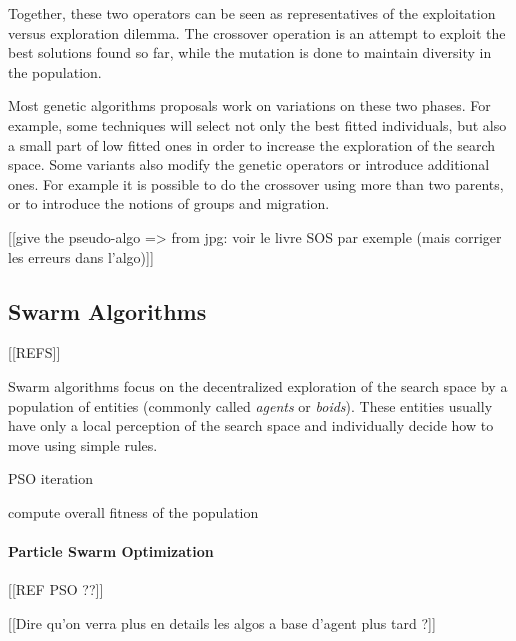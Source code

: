 Together, these two operators can be seen as representatives of the exploitation versus exploration dilemma. The crossover operation is an attempt to exploit the best solutions found so far, while the mutation is done to maintain diversity in the population. 

Most genetic algorithms proposals work on variations on these two phases. For example, some techniques will select not only the best fitted individuals, but also a small part of low fitted ones in order to increase the exploration of the search space. Some variants also modify the genetic operators or introduce additional ones. For example it is possible to do the crossover using more than two parents, or to introduce the notions of groups and migration.

[[give the pseudo-algo => from jpg: voir le livre SOS par exemple (mais corriger les erreurs dans l'algo)]]

\subsection{Swarm Algorithms}

[[REFS]]

Swarm algorithms focus on the decentralized exploration of the search space by a population of entities (commonly called \emph{agents} or \emph{boids}). These entities usually have only a local perception of the search space and individually decide how to move using simple rules.

\begin{algorithm}
\caption{PSO iteration}\label{PSO_algo}
\begin{algorithmic}

	compute overall fitness of the population\;

\end{algorithmic}
\end{algorithm}

\paragraph*{Particle Swarm Optimization}

[[REF PSO ??]]

[[Dire qu'on verra plus en details les algos a base d'agent plus tard ?]]

